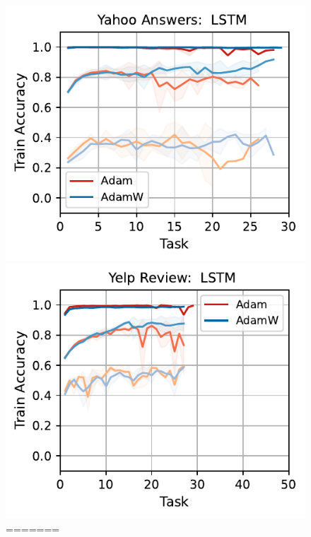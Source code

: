\begin{figure}[htb!]
{\includegraphics[width=\textwidth]{figs/Accuracy/nlp/lstm/yahoo_answers_50.pdf}
\includegraphics[width=\textwidth]{figs/Accuracy/nlp/lstm/yelp_review_full_50.pdf}
=======




}
\end{figure}
